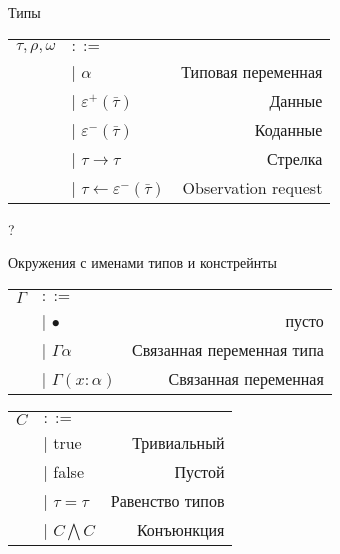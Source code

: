 \documentclass[10pt, mathserif]{beamer}
\let\\\tabularnewline
\let\\\tabularnewline
\theoremstyle{definition}
\begin{document}
\begin{frame}[c]{Типы}
\begin{tabular}{l l r}
  $\tau,\rho,\omega$ & $::=$ & \\
  &| $\alpha$ & Типовая переменная \\
  &| $\varepsilon^+(\bar{\tau})$  & Данные \\
  &| $\varepsilon^-(\bar{\tau})$  & Коданные \\
  &| $\tau \to \tau$ & Стрелка \\
  &| $\tau \leftarrow \varepsilon^-(\bar{\tau})$ & Observation request \\
\end{tabular}

\end{frame}

\begin{frame}[c]{?}

\end{frame}

\begin{frame}[c]{Окружения с именами типов и констрейнты}
\begin{tabular}{l l r}
  $\Gamma$ & $::=$ & \\
  &| $\bullet$ & пусто \\
  &| $\Gamma \alpha$  & Связанная переменная типа \\
  &| $\Gamma (x: \alpha)$ & Связанная переменная \\
\end{tabular}

\vspace{1cm}

\begin{tabular}{l l r}
  $C$ & $::=$ & \\
  &| true  & Тривиальный \\
  &| false & Пустой \\
  &| $\tau=\tau$ & Равенство типов\\
  &| $C \bigwedge C $ & Конъюнкция\\
\end{tabular}
\end{frame}
\end{document}
